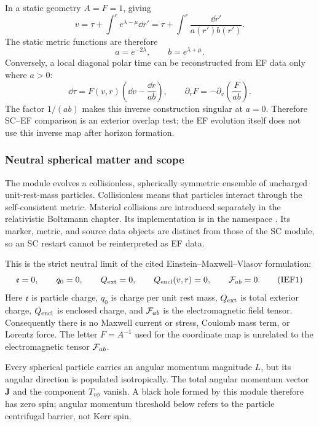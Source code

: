In a static geometry \(A=F=1\), giving
\[
 v=\tau+\int^r e^{\lambda-\mu}\dd r'
   =\tau+\int^r\frac{\dd r'}{a(r')b(r')}.                 \tag{IEF39}
\]
The static metric functions are therefore
\[
 a=e^{-2\lambda},\qquad b=e^{\lambda+\mu}.               \tag{IEF40}
\]
Conversely, a local diagonal polar time can be reconstructed from EF data only
where \(a>0\):
\[
 \dd\tau=F(v,r)\left(\dd v-\frac{\dd r}{ab}\right),\qquad
 \partial_r F=-\partial_v\left(\frac{F}{ab}\right).       \tag{IEF40d}
\]
The factor \(1/(ab)\) makes this inverse construction singular at \(a=0\).
Therefore SC--EF comparison is an exterior overlap test; the EF evolution
itself does not use this inverse map after horizon formation.

\subsubsection{Neutral spherical matter and scope}
\label{sec:ef-neutral-scope}

The module evolves a collisionless, spherically symmetric ensemble of
uncharged unit-rest-mass particles.  Collisionless means that particles
interact through the self-consistent metric.  Material collisions are
introduced separately in the relativistic Boltzmann chapter.  Its implementation is
in the namespace .  Its marker, metric, and
source data objects are distinct from those of the SC module, so an SC restart
cannot be reinterpreted as EF data.

This is the strict neutral limit of the cited Einstein--Maxwell--Vlasov
formulation:
\[
 \mathfrak e=0,\qquad q_0=0,\qquad Q_{\rm ext}=0,\qquad
 Q_{\rm encl}(v,r)=0,\qquad {\cal F}_{ab}=0.              \tag{IEF1}
\]
Here \(\mathfrak e\) is particle charge, \(q_0\) is charge per unit rest mass,
\(Q_{\rm ext}\) is total exterior charge, \(Q_{\rm encl}\) is enclosed charge,
and \({\cal F}_{ab}\) is the electromagnetic field tensor.  Consequently
there is no Maxwell current or stress, Coulomb mass term, or Lorentz force.
The letter \(F=A^{-1}\) used for the coordinate map is unrelated to the
electromagnetic tensor \({\cal F}_{ab}\).

Every spherical particle carries an angular momentum magnitude \(L\), but its
angular direction is populated isotropically.  The total angular momentum
vector \(\boldsymbol J\) and the component \(T_{v\phi}\) vanish.  A black hole
formed by this module therefore has zero spin; angular momentum threshold
below refers to the particle centrifugal barrier, not Kerr spin.

